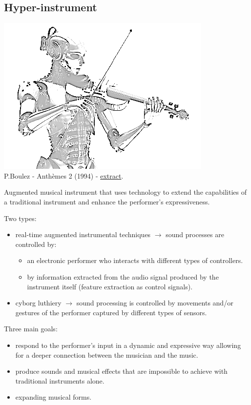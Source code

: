 \subsection{Hyper-instrument}\label{hyper-instrument}

\begin{center}
\includegraphics[scale=0.4]{../img/hyper.png}\\
P.Boulez - Anthèmes 2 (1994) - \href{suoni/boulez1.mp4}{extract}.
\end{center}

Augmented musical instrument that uses technology to extend the capabilities of a traditional instrument and enhance the performer's expressiveness.

Two types:

\begin{itemize}
\tightlist
\item real-time augmented instrumental techniques \(\rightarrow\) sound processes are controlled by:

  \begin{itemize}
  \tightlist
  \item an electronic performer who interacts with different types of controllers.
  \item by information extracted from the audio signal produced by the instrument itself (feature extraction as control signals).
  \end{itemize}
\item cyborg luthiery \(\rightarrow\) sound processing is controlled by movements and/or gestures of the performer captured by different types of sensors.
\end{itemize}

Three main goals:

\begin{itemize}
\tightlist
\item respond to the performer's input in a dynamic and expressive way allowing for a deeper connection between the musician and the music.
\item produce sounds and musical effects that are impossible to achieve with traditional instruments alone.
\item expanding musical forms.
\end{itemize}

